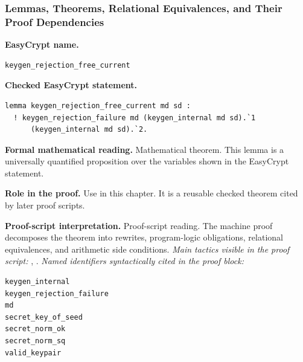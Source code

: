 \subsubsection*{Lemmas, Theorems, Relational Equivalences, and Their Proof Dependencies}
\begin{formaltheorem}
\noindent\textbf{EasyCrypt name.}
\begin{lstlisting}[language=EasyCrypt,basicstyle=\ttfamily\scriptsize]
keygen_rejection_free_current
\end{lstlisting}
\noindent\textbf{Checked EasyCrypt statement.}
\begin{lstlisting}[language=EasyCrypt,basicstyle=\ttfamily\scriptsize]
lemma keygen_rejection_free_current md sd :
  ! keygen_rejection_failure md (keygen_internal md sd).`1
      (keygen_internal md sd).`2.
\end{lstlisting}
\noindent\textbf{Formal mathematical reading.}
Mathematical theorem. This lemma is a universally quantified proposition over the variables shown in the EasyCrypt statement.

\noindent\textbf{Role in the proof.}
Use in this chapter. It is a reusable checked theorem cited by later proof scripts.

\noindent\textbf{Proof-script interpretation.}
Proof-script reading. The machine proof decomposes the theorem into rewrites, program-logic obligations, relational equivalences, and arithmetic side conditions.
\emph{Main tactics visible in the proof script:} , .
\emph{Named identifiers syntactically cited in the proof block:}
\begin{lstlisting}[language=EasyCrypt,basicstyle=\ttfamily\scriptsize]
keygen_internal
keygen_rejection_failure
md
secret_key_of_seed
secret_norm_ok
secret_norm_sq
valid_keypair
\end{lstlisting}

\end{formaltheorem}

